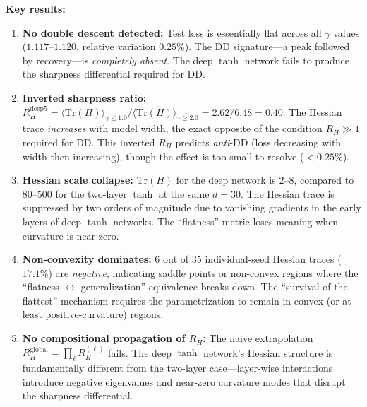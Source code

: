 \documentclass[
  journal=largetwo,
  simfonts=false,
  year=2025,
  volume=37,
]{cup-journal}
\begin{document}
\textbf{Key results:}
\begin{enumerate}
    \item \textbf{No double descent detected:} Test loss is essentially flat across all $\gamma$ values ($1.117$--$1.120$, relative variation $0.25\%$). The DD signature---a peak followed by recovery---is \emph{completely absent}. The deep $\tanh$ network fails to produce the sharpness differential required for DD.
    
    \item \textbf{Inverted sharpness ratio:} $R_H^{\mathrm{deep5}} = \langle\mathrm{Tr}(H)\rangle_{\gamma \leq 1.0} / \langle\mathrm{Tr}(H)\rangle_{\gamma \geq 2.0} = 2.62 / 6.48 = \mathbf{0.40}$. The Hessian trace \emph{increases} with model width, the exact opposite of the condition $R_H \gg 1$ required for DD. This inverted $R_H$ predicts \emph{anti}-DD (loss decreasing with width then increasing), though the effect is too small to resolve ($<0.25\%$).
    
    \item \textbf{Hessian scale collapse:} $\mathrm{Tr}(H)$ for the deep network is $2$--$8$, compared to $80$--$500$ for the two-layer $\tanh$ at the same $d=30$. The Hessian trace is suppressed by two orders of magnitude due to vanishing gradients in the early layers of deep $\tanh$ networks. The ``flatness'' metric loses meaning when curvature is near zero.
    
    \item \textbf{Non-convexity dominates:} $6$ out of $35$ individual-seed Hessian traces ($17.1\%$) are \emph{negative}, indicating saddle points or non-convex regions where the ``flatness $\leftrightarrow$ generalization'' equivalence breaks down. The ``survival of the flattest'' mechanism requires the parametrization to remain in convex (or at least positive-curvature) regions.
    
    \item \textbf{No compositional propagation of $R_H$:} The naive extrapolation $R_H^{\mathrm{global}} = \prod_{\ell} R_H^{(\ell)}$ fails. The deep $\tanh$ network's Hessian structure is fundamentally different from the two-layer case---layer-wise interactions introduce negative eigenvalues and near-zero curvature modes that disrupt the sharpness differential.
\end{enumerate}
\end{document}
